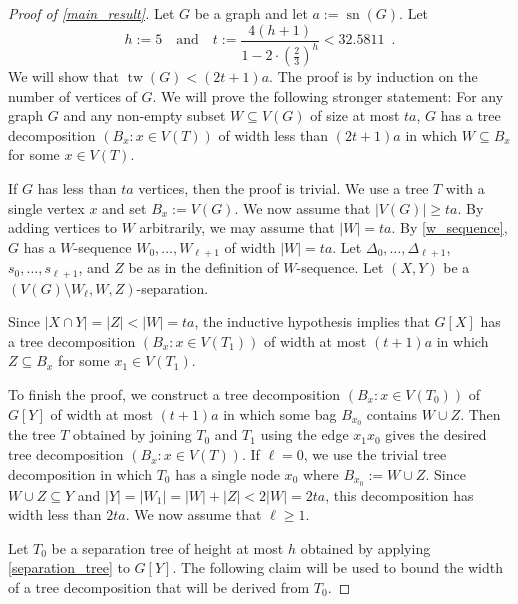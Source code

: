 \documentclass{patmorin}
\newcommand{\pat}[1]{\textcolor{Blue}{[Pat: #1]}}
\DeclareMathOperator{\sep}{sn}
\DeclareMathOperator{\tw}{tw}
\begin{document}
\begin{proof}[Proof of \cref{main_result}]
  Let $G$ be a graph and let $a:=\sep(G)$.  Let
  \[
    h:=5 \quad\text{and}\quad t:=\frac{4(h+1)}{1-2\cdot(\tfrac{2}{3})^h} < 32.5811 \enspace .
  \]
  We will show that $\tw(G)< (2t+1)a$. The proof is by induction on the number of vertices of $G$. We will prove the following stronger statement: For any graph $G$ and any non-empty subset $W\subseteq V(G)$ of size at most $ta$, $G$ has a tree decomposition $(B_x:x\in V(T))$ of width less than $(2t+1)a$ in which $W\subseteq B_x$ for some $x\in V(T)$.

  If $G$ has less than $ta$ vertices, then the proof is trivial. We use a tree $T$ with a single vertex $x$ and set $B_x:=V(G)$.  We now assume that $|V(G)|\ge ta$. By adding vertices to $W$ arbitrarily, we may assume that $|W|=ta$. By \cref{w_sequence}, $G$ has a $W$-sequence $W_0,\ldots,W_{\ell+1}$ of width $|W|=ta$. Let $\Delta_0,\ldots,\Delta_{\ell+1}$, $s_0,\ldots,s_{\ell+1}$, and $Z$ be as in the definition of $W$-sequence.  Let $(X,Y)$ be a $(V(G)\setminus W_{\ell},W,Z)$-separation.

  Since $|X\cap Y|=|Z|<|W|=ta$, the inductive hypothesis implies that $G[X]$ has a tree decomposition $(B_x:x\in V(T_1))$ of width at most $(t+1)a$ in which $Z\subseteq B_x$ for some $x_1\in V(T_1)$.

  To finish the proof, we construct a tree decomposition $(B_x:x\in V(T_0))$ of $G[Y]$ of width at most $(t+1)a$ in which some bag $B_{x_0}$ contains $W\cup Z$.  Then the tree $T$ obtained by joining $T_0$ and $T_1$ using the edge $x_1x_0$ gives the desired tree decomposition $(B_x:x\in V(T))$. If $\ell=0$, we use the trivial tree decomposition in which $T_0$ has a single node $x_0$ where $B_{x_0}:=W\cup Z$.  Since $W\cup Z\subseteq Y$ and $|Y|=|W_1|=|W|+|Z|< 2|W|=2ta$, this decomposition has width less than $2ta$. We now assume that $\ell\ge  1$.



  Let $T_0$ be a separation tree of height at most $h$ obtained by applying \cref{separation_tree} to  $G[Y]$.  The following claim will be used to bound the width of a tree decomposition that will be derived from $T_0$.


\end{proof}
\end{document}
